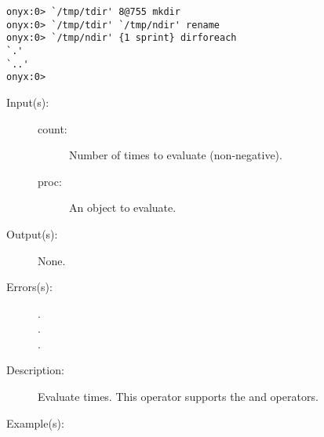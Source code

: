 \begin{description}
\begin{description}
\begin{verbatim}
onyx:0> `/tmp/tdir' 8@755 mkdir
onyx:0> `/tmp/tdir' `/tmp/ndir' rename
onyx:0> `/tmp/ndir' {1 sprint} dirforeach
`.'
`..'
onyx:0>
		\end{verbatim}
	\end{description}
\label{systemdict:repeat}
\item[{\onyxop{count proc}{repeat}{--}}: ]
	\begin{description}\item[]
	\item[Input(s): ]
		\begin{description}\item[]
		\item[count: ]
			Number of times to evaluate  (non-negative).
		\item[proc: ]
			An object to evaluate.
		\end{description}
	\item[Output(s): ] None.
	\item[Errors(s): ]
		\begin{description}\item[]
		\item[.]
		\item[.]
		\item[.]
		\end{description}
	\item[Description: ]
		Evaluate   times.  This operator
		supports the
		 and
		 operators.
	\item[Example(s): ]\begin{verbatim}


\end{verbatim}
\end{description}
\end{description}
